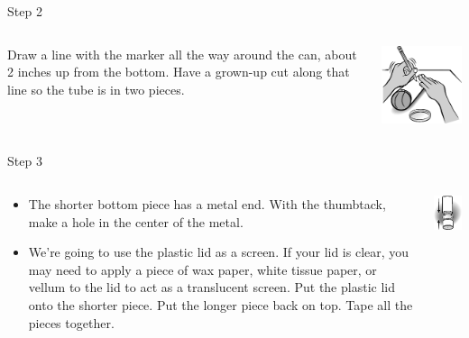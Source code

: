 \begin{frame}{Step 2}
  \begin{columns}
    \begin{column}{0.4\textwidth}
Draw a line with the marker all the way around the can, about 2 inches up from the bottom. Have a grown-up cut along that line so the tube is in two pieces.
    \end{column}
    \begin{column}{0.6\textwidth}
      \includegraphics{media/hand_pencil.png}
    \end{column}
  \end{columns}
\end{frame}

\begin{frame}{Step 3}
  \begin{columns}
    \begin{column}{0.6\textwidth}
      \begin{itemize}
        \item 
          The shorter bottom piece has a metal end. With the thumbtack, make a hole in the center of the metal.
        \item
          We're going to use the plastic lid as a screen. If your lid is clear, you may need to apply a piece of wax paper, white tissue paper, or vellum to the lid to act as a translucent screen. Put the plastic lid onto the shorter piece. Put the longer piece back on top. Tape all the pieces together.
      \end{itemize}
    \end{column}
    \begin{column}{0.4\textwidth}
      \includegraphics{media/can_cut_off.png}
    \end{column}
  \end{columns}
\end{frame}

